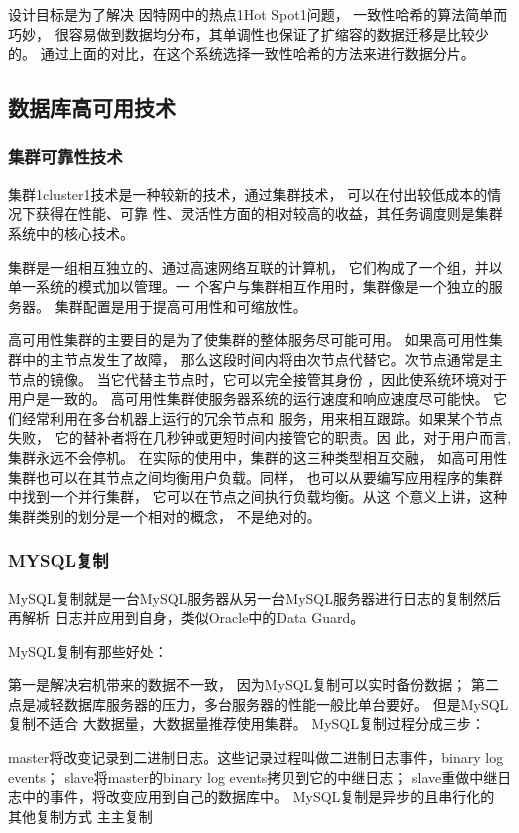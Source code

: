 设计目标是为了解决
因特网中的热点1Hot Spot1问题，
一致性哈希的算法简单而巧妙，
很容易做到数据均分布，其单调性也保证了扩缩容的数据迁移是比较少的。
通过上面的对比，在这个系统选择一致性哈希的方法来进行数据分片。
\subsection*{数据库高可用技术}
\subsubsection*{集群可靠性技术}
集群1cluster1技术是一种较新的技术，通过集群技术，
可以在付出较低成本的情况下获得在性能、可靠
性、灵活性方面的相对较高的收益，其任务调度则是集群系统中的核心技术。


集群是一组相互独立的、通过高速网络互联的计算机，
它们构成了一个组，并以单一系统的模式加以管理。一
个客户与集群相互作用时，集群像是一个独立的服务器。
集群配置是用于提高可用性和可缩放性。

高可用性集群的主要目的是为了使集群的整体服务尽可能可用。
如果高可用性集群中的主节点发生了故障，
那么这段时间内将由次节点代替它。次节点通常是主节点的镜像。
当它代替主节点时，它可以完全接管其身份
，因此使系统环境对于用户是一致的。
高可用性集群使服务器系统的运行速度和响应速度尽可能快。
它们经常利用在多台机器上运行的冗余节点和
服务，用来相互跟踪。如果某个节点失败，
它的替补者将在几秒钟或更短时间内接管它的职责。因
此，对于用户而言,集群永远不会停机。
在实际的使用中，集群的这三种类型相互交融，
如高可用性集群也可以在其节点之间均衡用户负载。同样，
也可以从要编写应用程序的集群中找到一个并行集群，
它可以在节点之间执行负载均衡。从这
个意义上讲，这种集群类别的划分是一个相对的概念，
不是绝对的。

\subsubsection*{MYSQL复制}
MySQL复制就是一台MySQL服务器从另一台MySQL服务器进行日志的复制然后再解析
日志并应用到自身，类似Oracle中的Data Guard。

MySQL复制有那些好处：

第一是解决宕机带来的数据不一致，
因为MySQL复制可以实时备份数据；
第二点是减轻数据库服务器的压力，多台服务器的性能一般比单台要好。
但是MySQL复制不适合
大数据量，大数据量推荐使用集群。
MySQL复制过程分成三步：

master将改变记录到二进制日志。这些记录过程叫做二进制日志事件，binary log events；
slave将master的binary log events拷贝到它的中继日志；
slave重做中继日志中的事件，将改变应用到自己的数据库中。
MySQL复制是异步的且串行化的
其他复制方式
主主复制

